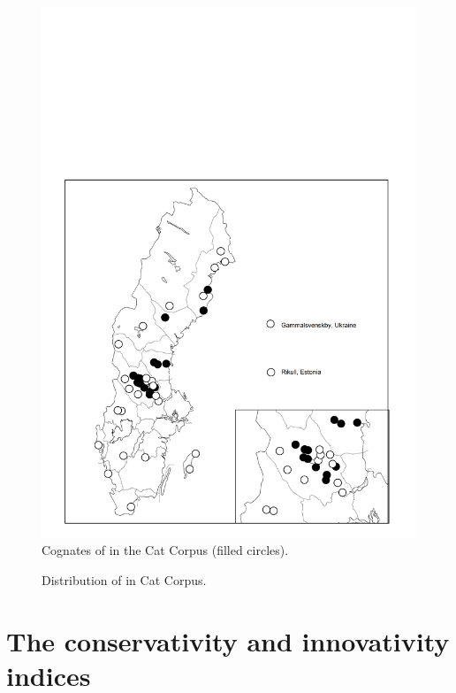 \begin{figure}[h]
\includegraphics[height=.5\textheight]{figures/36_CognatesCatCorpus}
\caption{Cognates of  in the Cat Corpus (filled circles).}
\label{map:32}
\end{figure}

\begin{figure}[h]
\caption{Distribution of  in Cat Corpus.}
\label{map:33}
\end{figure}
   
\section{The conservativity and innovativity indices}

